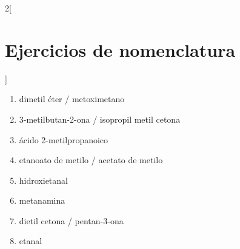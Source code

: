 \documentclass[10pt]{article}
\begin{document}
\begin{multicols*}{2}[
  \section{Ejercicios de nomenclatura}
  ]
\begin{solution}
  \begin{enumerate}
    \item dimetil éter / metoximetano
    \item 3-metilbutan-2-ona / isopropil metil cetona
    \item ácido 2-metilpropanoico
    \item etanoato de metilo / acetato de metilo
    \item hidroxietanal
    \item metanamina
    \item dietil cetona / pentan-3-ona
    \item etanal
  \end{enumerate}
\end{solution}

\end{multicols*}
\end{document}
